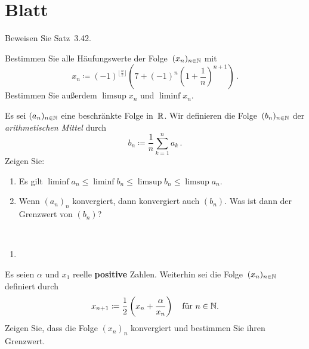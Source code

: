 \section{Blatt}

\begin{aufg}[6 Punkte]
Beweisen Sie Satz~3.42.
\end{aufg}

\bigskip

\begin{lsg}
\end{lsg}

\bigskip


\begin{aufg}[6 Punkte]
Bestimmen Sie alle H\"aufungswerte der Folge~$(x_n)_{n\in\mathbb{N}}$ mit 
\[
 x_n \coloneqq (-1)^{\lfloor \frac{n}{2}\rfloor} \left( 7 + (-1)^n\left(1+\frac1n\right)^{n+1} \right)\,. 
\]
Bestimmen Sie au{\ss}erdem $\limsup x_n$ und $\liminf x_n$.
\end{aufg}

\bigskip

\begin{lsg}
\end{lsg}

\bigskip

\begin{aufg}[6 Punkte]
Es sei $(a_n)_{n\in\mathbb{N}}$ eine beschr\"ankte Folge in~$\mathbb{R}$. Wir definieren die Folge~$(b_n)_{n\in\mathbb{N}}$ der \emph{arithmetischen Mittel} durch
\[
 b_n \coloneqq \frac1n\sum_{k=1}^n a_k\,.
\]
Zeigen Sie:
\begin{enumerate}[label=$\mathrm{(\roman*)}$, ref=$\mathrm{\roman*}$]
\item Es gilt $\liminf a_n \leq \liminf b_n \leq \limsup b_n \leq \limsup a_n$.
\item Wenn $(a_n)_n$ konvergiert, dann konvergiert auch $(b_n)$. Was ist dann der Grenzwert von $(b_n)$?
\end{enumerate}
\end{aufg}
 
\bigskip

\begin{lsg}\mbox{ }
\begin{enumerate}[label=$\mathrm{(\roman*)}$, ref=$\mathrm{\roman*}$]
\item 
\end{enumerate}
\end{lsg}

\bigskip

\begin{aufg}[6 Punkte]
Es seien $\alpha$ und $x_1$ reelle \textbf{positive} Zahlen. Weiterhin sei die Folge~$(x_n)_{n\in\mathbb{N}}$ definiert durch 
\[
 x_{n+1} \coloneqq \frac12\left(x_n + \frac{\alpha}{x_n}\right) \quad\text{f\"ur $n\in\mathbb{N}$.}
\]
Zeigen Sie, dass die Folge $(x_n)_n$ konvergiert und bestimmen Sie ihren Grenzwert.
\end{aufg}

